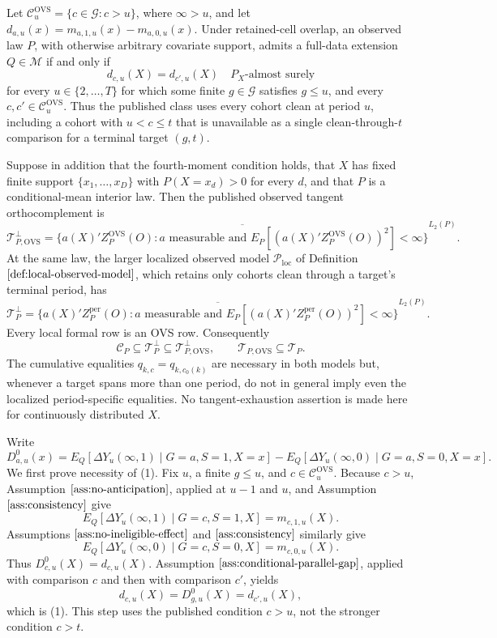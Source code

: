 Let \(\mathcal C_u^{\mathrm{OVS}}=\{c\in\mathcal G:c>u\}\), where \(\infty>u\), and let \(d_{a,u}(x)=m_{a,1,u}(x)-m_{a,0,u}(x)\).  Under retained-cell overlap, an observed law \(P\), with otherwise arbitrary covariate support, admits a full-data extension \(Q\in\mathcal M\) if and only if
\[
d_{c,u}(X)=d_{c',u}(X)
\quad P_X\text{-almost surely}
\tag{1}
\]
for every \(u\in\{2,\ldots,T\}\) for which some finite \(g\in\mathcal G\) satisfies \(g\le u\), and every \(c,c'\in\mathcal C_u^{\mathrm{OVS}}\).  Thus the published class uses every cohort clean at period \(u\), including a cohort with \(u<c\le t\) that is unavailable as a single clean-through-\(t\) comparison for a terminal target \((g,t)\).

Suppose in addition that the fourth-moment condition holds, that \(X\) has fixed finite support \(\{x_1,\ldots,x_D\}\) with \(P(X=x_d)>0\) for every \(d\), and that \(P\) is a conditional-mean interior law.  Then the published observed tangent orthocomplement is
\[
\mathcal T_{P,\mathrm{OVS}}^\perp
=\overline{\{a(X)'Z_P^{\mathrm{OVS}}(O):a\text{ measurable and }
E_P[(a(X)'Z_P^{\mathrm{OVS}}(O))^2]<\infty\}}^{L_2(P)}.
\tag{2}
\]
At the same law, the larger localized observed model \(\mathcal P_{\mathrm{loc}}\) of Definition \(\ref{def:local-observed-model}\), which retains only cohorts clean through a target's terminal period, has
\[
\mathcal T_P^\perp
=\overline{\{a(X)'Z_P^{\mathrm{per}}(O):a\text{ measurable and }
E_P[(a(X)'Z_P^{\mathrm{per}}(O))^2]<\infty\}}^{L_2(P)}.
\tag{3}
\]
Every local formal row is an OVS row.  Consequently
\[
\mathcal C_P\subseteq\mathcal T_P^\perp
\subseteq\mathcal T_{P,\mathrm{OVS}}^\perp,
\qquad
\mathcal T_{P,\mathrm{OVS}}\subseteq\mathcal T_P.
\tag{4}
\]
The cumulative equalities \(q_{k,c}=q_{k,c_0(k)}\) are necessary in both models but, whenever a target spans more than one period, do not in general imply even the localized period-specific equalities.  No tangent-exhaustion assertion is made here for continuously distributed \(X\).

Write
\[
D^0_{a,u}(x)=E_Q[\Delta Y_u(\infty,1)\mid G=a,S=1,X=x]
-E_Q[\Delta Y_u(\infty,0)\mid G=a,S=0,X=x].
\]
We first prove necessity of (1).  Fix \(u\), a finite \(g\le u\), and \(c\in\mathcal C_u^{\mathrm{OVS}}\).  Because \(c>u\), Assumption \(\ref{ass:no-anticipation}\), applied at \(u-1\) and \(u\), and Assumption \(\ref{ass:consistency}\) give
\[
E_Q[\Delta Y_u(\infty,1)\mid G=c,S=1,X]=m_{c,1,u}(X).
\tag{5}
\]
Assumptions \(\ref{ass:no-ineligible-effect}\) and \(\ref{ass:consistency}\) similarly give
\[
E_Q[\Delta Y_u(\infty,0)\mid G=c,S=0,X]=m_{c,0,u}(X).
\tag{6}
\]
Thus \(D^0_{c,u}(X)=d_{c,u}(X)\).  Assumption \(\ref{ass:conditional-parallel-gap}\), applied with comparison \(c\) and then with comparison \(c'\), yields
\[
d_{c,u}(X)=D^0_{g,u}(X)=d_{c',u}(X),
\]
which is (1).  This step uses the published condition \(c>u\), not the stronger condition \(c>t\).

